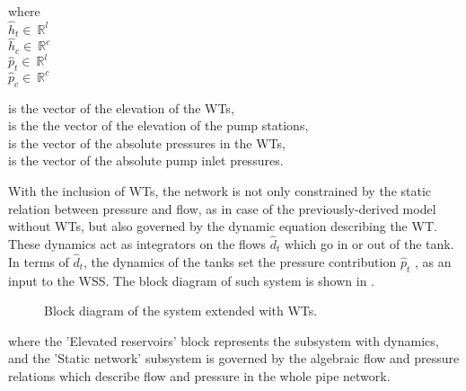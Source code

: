  \begin{minipage}[t]{0.20\textwidth}
where\\
\hspace*{8mm} $\hat{h}_t \in \: \mathbb{R}^{l }$\\
\hspace*{8mm} $\hat{h}_c \in \: \mathbb{R}^{c }$ \\
\newline
\hspace*{8mm} $\hat{p}_t \in \: \mathbb{R}^{l }$\\
\hspace*{8mm} $\hat{p}_c \in \: \mathbb{R}^{c }$ 
\end{minipage}
\begin{minipage}[t]{0.68\textwidth}
\vspace*{2mm}
is the vector of the elevation of the WTs,\\
is the the vector of the elevation of the pump stations,\\
is the vector of the absolute pressures in the WTs,\\
is the vector of the absolute pump inlet pressures.
\end{minipage}

With the inclusion of WTs, the network is not only constrained by the static relation between pressure and flow, as in case of the previously-derived model without WTs, but also governed by the dynamic equation describing the WT. These dynamics act as integrators on the flows $\hat{d}_t$ which go in or out of the tank. In terms of $\hat{d}_t$, the dynamics of the tanks set the pressure contribution $\hat{p}_t$ , as an input to the WSS. The block diagram of such system is shown in .

\begin{figure}[H]
\centering
 
\caption{Block diagram of the system extended with WTs.}
\label{fig:WT_system_blockdiagram}
\end{figure}
\vspace{-3mm}

where the 'Elevated reservoirs' block represents the subsystem with dynamics, and the 'Static network' subsystem is governed by the algebraic flow and pressure relations which describe flow and pressure in the whole pipe network. 

